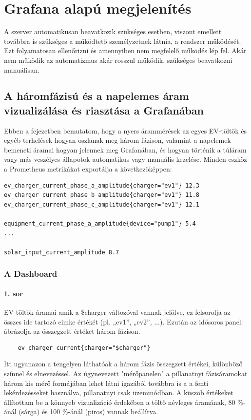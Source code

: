 \section{Grafana alapú megjelenítés}

A szerver automatikusan beavatkozik szükséges esetben, viszont emellett továbbra 
is szükséges a működtető személyzetnek látnia, a rendszer működését. Ezt folyamatosan 
ellenőrizni és amennyiben nem megfelelő működés lép fel. Akár nem működik az 
automatizmus akár rosszul működik, szükséges beavatkozni manuálisan.

\subsection{A háromfázisú és a napelemes áram vizualizálása és riasztása a Grafanában}
Ebben a fejezetben bemutatom, hogy a nyers árammérések az egyes EV-töltők és 
egyéb terhelések hogyan oszlanak meg három fázison, valamint a napelemek 
bemeneti áramai hogyan jelennek meg Grafanában, és hogyan történik a 
túláram vagy más veszélyes állapotok automatikus vagy manuális kezelése. 
Minden eszköz a Prometheus metrikákat exportálja a következőképpen:

\begin{lstlisting}
ev_charger_current_phase_a_amplitude{charger="ev1"} 12.3
ev_charger_current_phase_b_amplitude{charger="ev1"} 11.8
ev_charger_current_phase_c_amplitude{charger="ev1"} 12.1

equipment_current_phase_a_amplitude{device="pump1"} 5.4
... 

solar_input_current_amplitude 8.7
\end{lstlisting}

\subsubsection{A Dashboard}
\paragraph{1. sor}
EV töltők áramai amik a
\$charger változóval vannak jelölve, ez felsorolja az összes ide  tartozó cimke értékét 
(pl. „ev1”, „ev2”, ...).
Ezután az idősoros panel: ábrázolja az összegzett értéket három fázison.
\begin{lstlisting}
    ev_charger_current{charger="$charger"}
\end{lstlisting}
Itt ugyanazon a tengelyen láthatóak a három fázis összegzett értékei, 
különböző színnel és elnevezéssel.
Az úgynevezett "mérőpanelen" a pillanatnyi fázisáramokat három kis mérő formájában
lehet látni igazából továbbra is a a fenti lekérdezésseket használva, 
pillanatnyi csak üzemmódban.
A küszöb értékeket állítottam be a könnyeb vizualizáció érdekében 
a töltő névleges áramának, 
80 \%-ánál (sárga) és 100 \%-ánál (piros) vannak beállítva.

